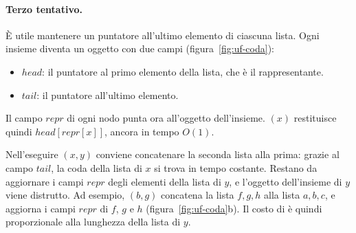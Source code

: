 \paragraph{Terzo tentativo.}
È utile mantenere un puntatore all'ultimo elemento di ciascuna lista. Ogni insieme diventa un oggetto con due campi (figura~\ref{fig:uf-coda}):
\begin{itemize}
    \item $\mathit{head}$: il puntatore al primo elemento della lista, che è il rappresentante.
    \item $\mathit{tail}$: il puntatore all'ultimo elemento.
\end{itemize}

Il campo $\mathit{repr}$ di ogni nodo punta ora all'oggetto dell'insieme. \FindSet$(x)$ restituisce quindi $\mathit{head}[\mathit{repr}[x]]$, ancora in tempo $O(1)$.

Nell'eseguire \Union$(x,y)$ conviene concatenare la seconda lista alla prima: grazie al campo $\mathit{tail}$, la coda della lista di $x$ si trova in tempo costante. Restano da aggiornare i campi $\mathit{repr}$ degli elementi della lista di $y$, e l'oggetto dell'insieme di $y$ viene distrutto. Ad esempio, \Union$(b,g)$ concatena la lista $f, g, h$ alla lista $a, b, c$, e aggiorna i campi $\mathit{repr}$ di $f$, $g$ e $h$ (figura~\ref{fig:uf-coda}b). Il costo di \Union{} è quindi proporzionale alla lunghezza della lista di $y$.

